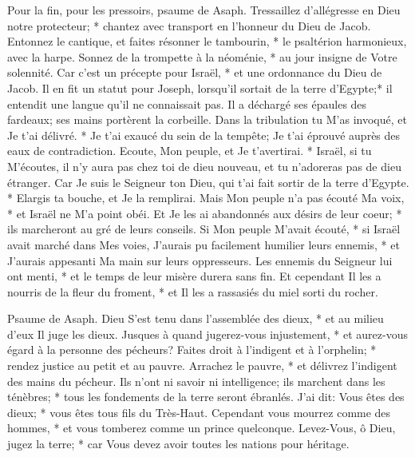 Pour la fin, pour les pressoirs, psaume de Asaph.
Tressaillez d'allégresse en Dieu notre protecteur; * chantez avec transport en l'honneur du Dieu de Jacob.
Entonnez le cantique, et faites résonner le tambourin, * le psaltérion harmonieux, avec la harpe.
Sonnez de la trompette à la néoménie, * au jour insigne de Votre solennité.
Car c'est un précepte pour Israël, * et une ordonnance du Dieu de Jacob.
Il en fit un statut pour Joseph, lorsqu'il sortait de la terre d'Egypte;* il entendit une langue qu'il ne connaissait pas.
Il a déchargé ses épaules des fardeaux; ses mains portèrent la corbeille.
Dans la tribulation tu M'as invoqué, et Je t'ai délivré. * Je t'ai exaucé du sein de la tempête; Je t'ai éprouvé auprès des eaux de contradiction.
Ecoute, Mon peuple, et Je t'avertirai. * Israël, si tu M'écoutes,
il n'y aura pas chez toi de dieu nouveau, et tu n'adoreras pas de dieu étranger.
Car Je suis le Seigneur ton Dieu, qui t'ai fait sortir de la terre d'Egypte. * Elargis ta bouche, et Je la remplirai.
Mais Mon peuple n'a pas écouté Ma voix, * et Israël ne M'a point obéi.
Et Je les ai abandonnés aux désirs de leur coeur; * ils marcheront au gré de leurs conseils.
Si Mon peuple M'avait écouté, * si Israël avait marché dans Mes voies,
J'aurais pu facilement humilier leurs ennemis, * et J'aurais appesanti Ma main sur leurs oppresseurs.
Les ennemis du Seigneur lui ont menti, * et le temps de leur misère durera sans fin.
Et cependant Il les a nourris de la fleur du froment, * et Il les a rassasiés du miel sorti du rocher.

Psaume de Asaph. Dieu S'est tenu dans l'assemblée des dieux, * et au milieu d'eux Il juge les dieux.
Jusques à quand jugerez-vous injustement, * et aurez-vous égard à la personne des pécheurs?
Faites droit à l'indigent et à l'orphelin; * rendez justice au petit et au pauvre.
Arrachez le pauvre, * et délivrez l'indigent des mains du pécheur.
Ils n'ont ni savoir ni intelligence; ils marchent dans les ténèbres; * tous les fondements de la terre seront ébranlés.
J'ai dit: Vous êtes des dieux; * vous êtes tous fils du Très-Haut.
Cependant vous mourrez comme des hommes, * et vous tomberez comme un prince quelconque.
Levez-Vous, ô Dieu, jugez la terre; * car Vous devez avoir toutes les nations pour héritage.

